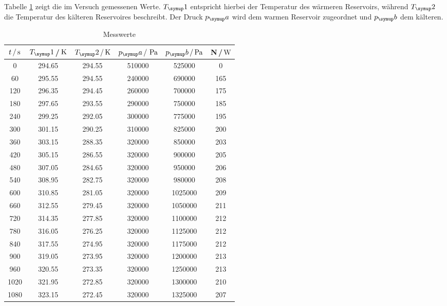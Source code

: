 Tabelle \ref{tab:messwerte} zeigt die im Versuch gemessenen Werte.
$T_\su{1}$ entspricht hierbei der Temperatur des wärmeren Reservoirs, während $T_\su{2}$
die Temperatur des kälteren Reservoires beschreibt. Der Druck $p_\su{a}$ wird dem warmen Reservoir
zugeordnet und $p_\su{b}$ dem kälteren.
\begin{table}[h]
  \centering
  \begin{tabular}{c c c c c c}
    \toprule
    $t\,/\,\si{\second}$ &$T_\su{1}$\,/$\,\si{\kelvin}$ & $T_\su{2}\,/\Kel$ & $p_\su{a}\,/\,\pas $ &
    $p_\su{b}\,/ \pas$ & N\,/$\,\si{\watt}$  \\
    \midrule
       0   &   294.65   &   294.55   &   510000    &     525000   &      0 \\
      60   &   295.55   &   294.55   &   240000    &     690000   &    165 \\
     120   &   296.35   &   294.45   &   260000    &     700000   &    175 \\
     180   &   297.65   &   293.55   &   290000    &     750000   &    185 \\
     240   &   299.25   &   292.05   &   300000    &     775000   &    195 \\
     300   &   301.15   &   290.25   &   310000    &     825000   &    200 \\
     360   &   303.15   &   288.35   &   320000    &     850000   &    203 \\
     420   &   305.15   &   286.55   &   320000    &     900000   &    205 \\
     480   &   307.05   &   284.65   &   320000    &     950000   &    206 \\
     540   &   308.95   &   282.75   &   320000    &     980000   &    208 \\
     600   &   310.85   &   281.05   &   320000    &    1025000   &    209 \\
     660   &   312.55   &   279.45   &   320000    &    1050000   &    211 \\
     720   &   314.35   &   277.85   &   320000    &    1100000   &    212 \\
     780   &   316.05   &   276.25   &   320000    &    1125000   &    212 \\
     840   &   317.55   &   274.95   &   320000    &    1175000   &    212 \\
     900   &   319.05   &   273.95   &   320000    &    1200000   &    213 \\
     960   &   320.55   &   273.35   &   320000    &    1250000   &    213 \\
    1020   &   321.95   &   272.85   &   320000    &    1300000   &    210 \\
    1080   &   323.15   &   272.45   &   320000    &    1325000   &    207 \\
    \bottomrule
  \end{tabular}
  \caption{Messwerte}
  \label{tab:messwerte}
\end{table}
